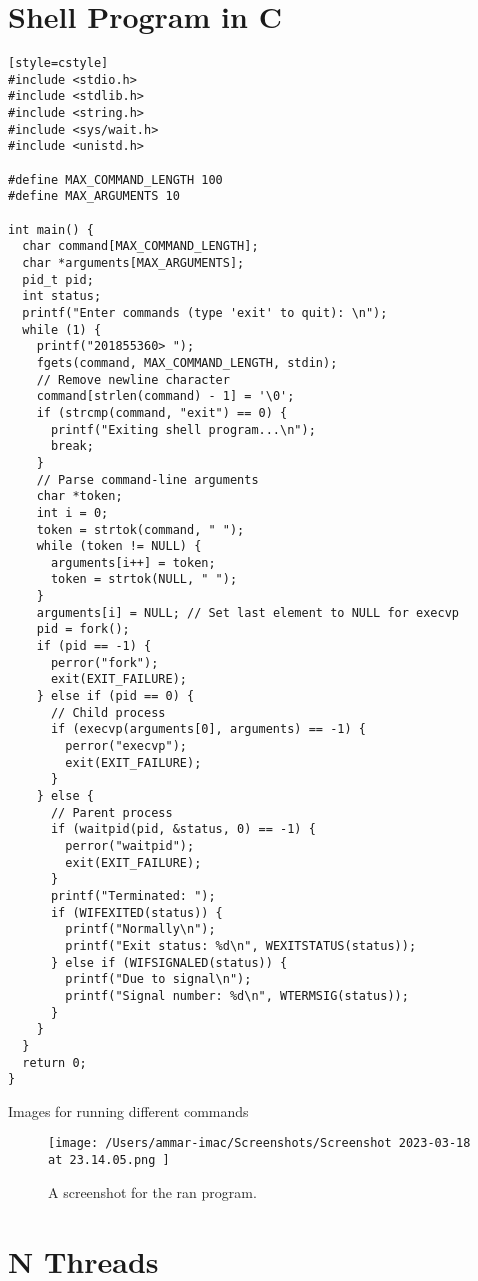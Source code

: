 \documentclass{article}
\begin{document}
\section{Shell Program in C}%
\begin{lstlisting}[style=cstyle][style=cstyle]
#include <stdio.h>
#include <stdlib.h>
#include <string.h>
#include <sys/wait.h>
#include <unistd.h>

#define MAX_COMMAND_LENGTH 100
#define MAX_ARGUMENTS 10

int main() {
  char command[MAX_COMMAND_LENGTH];
  char *arguments[MAX_ARGUMENTS];
  pid_t pid;
  int status;
  printf("Enter commands (type 'exit' to quit): \n");
  while (1) {
    printf("201855360> ");
    fgets(command, MAX_COMMAND_LENGTH, stdin);
    // Remove newline character
    command[strlen(command) - 1] = '\0';
    if (strcmp(command, "exit") == 0) {
      printf("Exiting shell program...\n");
      break;
    }
    // Parse command-line arguments
    char *token;
    int i = 0;
    token = strtok(command, " ");
    while (token != NULL) {
      arguments[i++] = token;
      token = strtok(NULL, " ");
    }
    arguments[i] = NULL; // Set last element to NULL for execvp
    pid = fork();
    if (pid == -1) {
      perror("fork");
      exit(EXIT_FAILURE);
    } else if (pid == 0) {
      // Child process
      if (execvp(arguments[0], arguments) == -1) {
        perror("execvp");
        exit(EXIT_FAILURE);
      }
    } else {
      // Parent process
      if (waitpid(pid, &status, 0) == -1) {
        perror("waitpid");
        exit(EXIT_FAILURE);
      }
      printf("Terminated: ");
      if (WIFEXITED(status)) {
        printf("Normally\n");
        printf("Exit status: %d\n", WEXITSTATUS(status));
      } else if (WIFSIGNALED(status)) {
        printf("Due to signal\n");
        printf("Signal number: %d\n", WTERMSIG(status));
      }
    }
  }
  return 0;
}
\end{lstlisting}

\newpage
Images for running different commands

\begin{figure}[ht]
	\centering
	\texttt{[image: /Users/ammar-imac/Screenshots/Screenshot 2023-03-18 at 23.14.05.png ]}
	\caption{A screenshot for the ran program.}
\end{figure}


\newpage
\section{N Threads}
\end{document}

